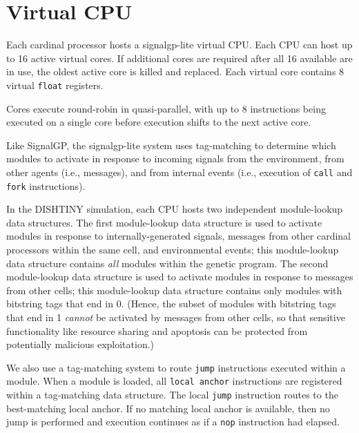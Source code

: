 \section{Virtual CPU} \label{sec:virtual_cpu}

Each cardinal processor hosts a signalgp-lite virtual CPU.
Each CPU can host up to 16 active virtual cores.
If additional cores are required after all 16 available are in use, the oldest active core is killed and replaced.
Each virtual core contains 8 virtual \texttt{float} registers.

Cores execute round-robin in quasi-parallel, with up to 8 instructions being executed on a single core before execution shifts to the next active core.

Like SignalGP, the signalgp-lite system uses tag-matching to determine which modules to activate in response to incoming signals from the environment, from other agents (i.e., messages), and from internal events (i.e., execution of \texttt{call} and \texttt{fork} instructions).

In the DISHTINY simulation, each CPU hosts two independent module-lookup data structures.
The first module-lookup data structure is used to activate modules in response to internally-generated signals, messages from other cardinal processors within the same cell, and environmental events;
this module-lookup data structure contains \textit{all} modules within the genetic program.
The second module-lookup data structure is used to activate modules in response to messages from other cells;
this module-lookup data structure contains only modules with bitstring tags that end in 0.
(Hence, the subset of modules with bitstring tags that end in 1 \textit{cannot} be activated by messages from other cells, so that sensitive functionality like resource sharing and apoptosis can be protected from potentially malicious exploitation.)

We also use a tag-matching system to route \texttt{jump} instructions executed within a module.
When a module is loaded, all \texttt{local anchor} instructions are registered within a tag-matching data structure.
The local \texttt{jump} instruction routes to the best-matching local anchor.
If no matching local anchor is available, then no jump is performed and execution continues as if a \texttt{nop} instruction had elapsed.
